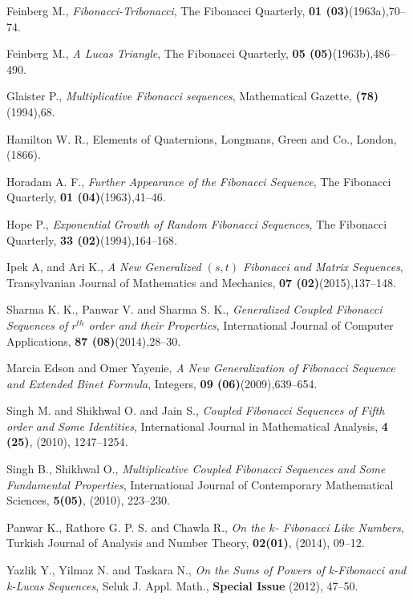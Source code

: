 \begin{thebibliography}{00}
{Feinberg M., \emph{ Fibonacci-Tribonacci}, The Fibonacci Quarterly, \textbf{01 (03)}(1963a),70--74}.

{Feinberg M., \emph{ A Lucas Triangle}, The Fibonacci Quarterly, \textbf{05 (05)}(1963b),486--490}.

{Glaister P., \emph{ Multiplicative Fibonacci sequences}, Mathematical Gazette, \textbf{(78)}(1994),68}.

{ Hamilton W. R., {Elements of Quaternions}, {Longmans, Green and Co., London}, (1866).}

{Horadam A. F., \emph{ Further Appearance of the Fibonacci Sequence}, The Fibonacci Quarterly, \textbf{01 (04)}(1963),41--46}.

{Hope P., \emph{ Exponential Growth of Random Fibonacci Sequences}, The Fibonacci Quarterly, \textbf{33 (02)}(1994),164--168}.

{Ipek A, and Ari K., \emph{ A New Generalized $(s, t)$ Fibonacci and Matrix Sequences}, Transylvanian Journal of Mathematics and Mechanics, \textbf{07 (02)}(2015),137--148}.

{Sharma K. K., Panwar V. and Sharma S. K., \emph{ Generalized Coupled Fibonacci Sequences of $r^{th}$ order and their Properties}, International Journal of Computer Applications, \textbf{87 (08)}(2014),28--30}.

{Marcia Edson and Omer Yayenie, \emph{ A New Generalization of Fibonacci Sequence and Extended Binet Formula}, Integers, \textbf{09 (06)}(2009),639--654}.

{Singh M. and Shikhwal O. and Jain S., \emph{Coupled Fibonacci Sequences of Fifth order and Some Identities}, International Journal in Mathematical Analysis, \textbf{4 (25)}, (2010), 1247--1254}.

{Singh B., Shikhwal O., \emph{Multiplicative Coupled Fibonacci Sequences and Some Fundamental Properties}, International Journal of Contemporary Mathematical Sciences, \textbf{5(05)}, (2010), 223--230}.

{Panwar K., Rathore G. P. S. and Chawla R., \emph{On the $k$- Fibonacci Like Numbers}, Turkish Journal of Analysis and Number Theory, \textbf{02(01)}, (2014), 09--12}.

{Yazlik Y., Yilmaz N. and Taskara N., {\emph{On the Sums of Powers of k-Fibonacci and k-Lucas Sequences}}, Seluk J. Appl. Math., \textbf{Special Issue} (2012), 47--50.}


\end{thebibliography}
